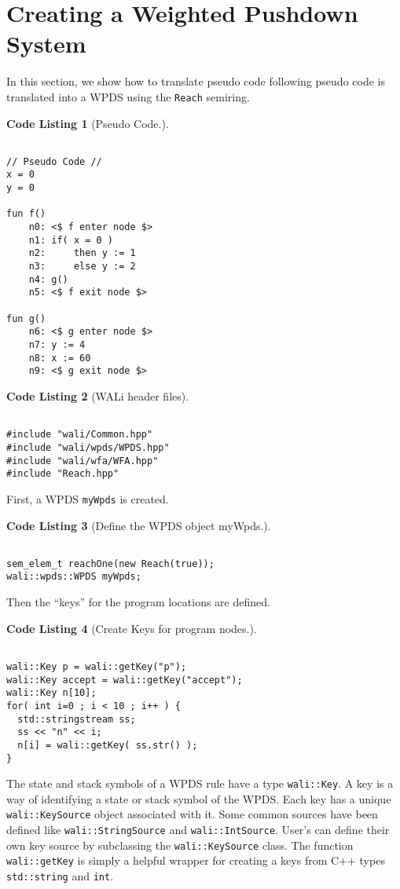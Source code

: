 \documentclass[english,a4paper,11pt]{article}
\theoremstyle{definition}
\newtheorem{codelist}{Code Listing}[section]
\def\WALi{\textsf{WALi}\xspace}
\begin{document}
\section{Creating a Weighted Pushdown System}
In this section, we show how to translate pseudo code 
following pseudo code is translated
into a WPDS using the \verb!Reach! semiring.
\begin{codelist}[Pseudo Code.]
\label{Fi:PseudoCode}
\begin{lstlisting}

// Pseudo Code //
x = 0
y = 0

fun f()
    n0: <$ f enter node $>
    n1: if( x = 0 )
    n2:     then y := 1
    n3:     else y := 2
    n4: g()
    n5: <$ f exit node $>

fun g()
    n6: <$ g enter node $>
    n7: y := 4
    n8: x := 60
    n9: <$ g exit node $>
\end{lstlisting}
\end{codelist}

\begin{codelist}[\WALi header files]
\label{ExReach}
\begin{lstlisting}

#include "wali/Common.hpp"
#include "wali/wpds/WPDS.hpp"
#include "wali/wfa/WFA.hpp"
#include "Reach.hpp"
\end{lstlisting}
\end{codelist}

First, a WPDS \verb!myWpds! is created. 
\begin{codelist}[Define the WPDS object myWpds.]
\label{myWpds}
\begin{lstlisting}

sem_elem_t reachOne(new Reach(true));
wali::wpds::WPDS myWpds;
\end{lstlisting}
\end{codelist}

Then the ``keys'' for the program locations are defined.
\begin{codelist}[Create Keys for program nodes.]
\label{Keys}
\begin{lstlisting}

wali::Key p = wali::getKey("p");
wali::Key accept = wali::getKey("accept");
wali::Key n[10];
for( int i=0 ; i < 10 ; i++ ) {
  std::stringstream ss;
  ss << "n" << i;
  n[i] = wali::getKey( ss.str() );
}
\end{lstlisting}
\end{codelist}
The state and stack symbols of a WPDS rule have a type \verb!wali::Key!. A key
is a way of identifying a state or stack symbol of the WPDS\@. Each key has a
unique \verb!wali::KeySource! object associated with it. Some common sources
have been defined like \verb!wali::StringSource! and \verb!wali::IntSource!.
User's can define their own key source by subclassing the
\verb!wali::KeySource! class. The function \verb!wali::getKey! is simply a
helpful wrapper for creating a keys from C++ types \verb!std::string! and
\verb!int!. 
\end{document}
